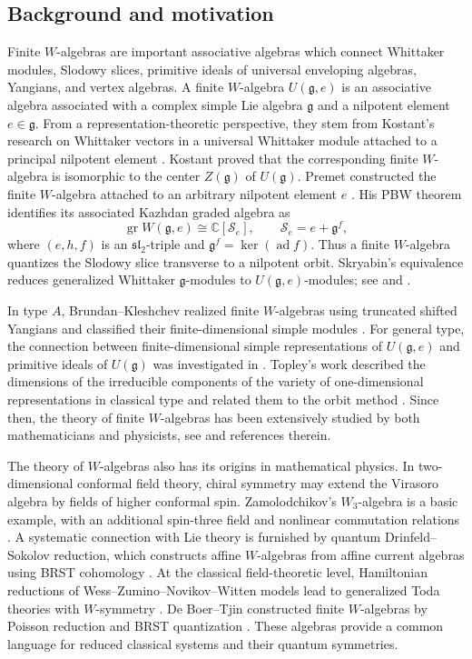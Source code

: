\documentclass[12pt,a4paper]{amsart}
\numberwithin{equation}{section}
\theoremstyle{definition}
\theoremstyle{remark}
\newcommand{\C}{\mathbb{C}}
\newcommand{\g}{\mathfrak g}
\newcommand{\ad}{\operatorname{ad}}
\begin{document}
\subsection{Background and motivation}
Finite \(W\)-algebras are important associative algebras which connect Whittaker modules, Slodowy slices,
primitive ideals of universal enveloping algebras, Yangians, and vertex algebras. A finite $W$-algebra $U(\g, e)$ is an associative algebra associated with a complex simple Lie algebra $\g$ and a nilpotent element $e \in\g$.
From a representation-theoretic perspective, they stem from Kostant's research on Whittaker vectors in a universal Whittaker module attached to a principal nilpotent element \cite{Kostant1978}.  Kostant proved that the corresponding finite \(W\)-algebra is isomorphic to the center \(Z(\mathfrak{g})\) of \(U(\mathfrak{g})\).
Premet constructed the finite \(W\)-algebra attached to an arbitrary
nilpotent element $e$ \cite{Pr1}.
His PBW theorem  identifies its associated Kazhdan graded algebra as
\[
 \operatorname{gr}W(\g,e)\cong\C[\mathcal S_e],
 \qquad \mathcal S_e=e+\g^{f},
\]
where \((e,h,f)\) is an \(\mathfrak{sl}_2\)-triple and
\(\g^{f}=\ker(\ad f)\).
Thus a finite \(W\)-algebra quantizes the Slodowy slice transverse
to a nilpotent orbit.
Skryabin's equivalence reduces generalized Whittaker
\(\g\)-modules to $U(\g,e)$-modules; see \cite[Appendix]{Pr1} and
\cite[Theorem~6.1]{GG}.


In type \(A\), Brundan--Kleshchev realized finite \(W\)-algebras using
truncated shifted Yangians and classified their finite-dimensional simple
modules \cite{BK1,BK2}.
For general type, the connection between finite-dimensional simple representations of
$U(\g, e)$  and primitive ideals of $U(\g)$ was investigated  in \cite{L2,L3,LO,Pr2,Pr4}.
Topley's work described the dimensions of the irreducible components
of the variety of one-dimensional representations in classical type
and related them to the orbit method \cite{T}. Since then, the theory of finite $W$-algebras has been extensively studied by both mathematicians and physicists, see \cite{GG,L10,L1,L2,Pe,PT,RS,VD,We} and references therein.


The theory of \(W\)-algebras also has its origins in mathematical physics.
In two-dimensional conformal field theory, chiral symmetry may extend
the Virasoro algebra by fields of higher conformal spin.
Zamolodchikov's \(W_3\)-algebra is a basic example, with an additional
spin-three field and nonlinear commutation relations \cite{Z}.
A systematic connection with Lie theory is furnished by quantum
Drinfeld--Sokolov reduction, which constructs affine \(W\)-algebras
from affine current algebras using BRST cohomology \cite{FF,KRW}.
At the classical field-theoretic level, Hamiltonian reductions of
Wess--Zumino--Novikov--Witten models lead to generalized Toda theories
with \(W\)-symmetry \cite{FRTW}.
De Boer--Tjin constructed finite \(W\)-algebras by
Poisson reduction and BRST quantization \cite{BT}.
These algebras provide a common language for reduced classical
systems and their quantum symmetries.
\end{document}
